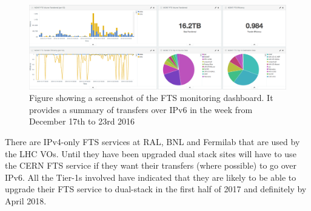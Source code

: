 \documentclass[a4paper]{jpconf}
\begin{document}
\begin{figure}[htbp]
\begin{center}
\includegraphics[width=\textwidth]{FTSIPv6Monitoring}
\caption{Figure showing a screenshot of the FTS monitoring dashboard.  It provides a summary of transfers over IPv6 in the week from December 17th to 23rd 2016}
\label{Fig:FTSMonitor}
\end{center}
\end{figure}

There are IPv4-only FTS services at RAL, BNL and Fermilab that are used by the LHC VOs.  Until they have been upgraded dual stack sites will have to use the CERN FTS service  if they want their transfers (where possible) to go over IPv6.  All the Tier-1s involved have indicated that they are likely to be able to upgrade their FTS service to dual-stack in the first half of 2017 and definitely by April 2018.



\end{document}
